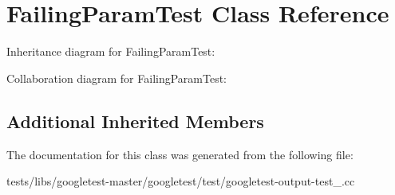 \hypertarget{classFailingParamTest}{}\section{Failing\+Param\+Test Class Reference}
\label{classFailingParamTest}


Inheritance diagram for Failing\+Param\+Test\+:


Collaboration diagram for Failing\+Param\+Test\+:
\subsection*{Additional Inherited Members}


The documentation for this class was generated from the following file\+:\begin{DoxyCompactItemize}
\item 
tests/libs/googletest-\/master/googletest/test/googletest-\/output-\/test\+\_\+.\+cc\end{DoxyCompactItemize}
